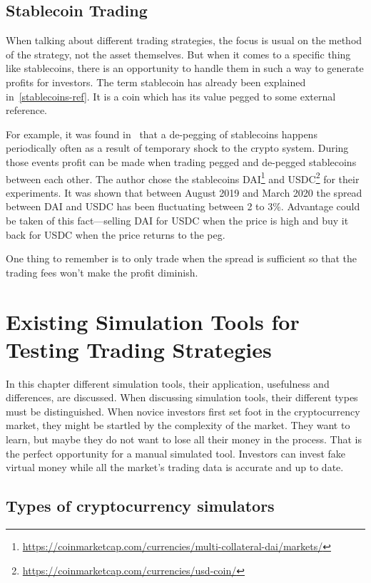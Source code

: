 \section{Stablecoin Trading}

When talking about different trading strategies, the focus is usual on the method of the strategy, not the asset themselves. But when it comes to a specific thing like stablecoins, there is an opportunity to handle them in such a way to generate profits for investors.
The term stablecoin has already been explained in~\ref{stablecoins-ref}. It is a coin which has its value pegged to some external reference.

For example, it was found in~\cite{make-money-stablecoins} that a de-pegging of stablecoins happens periodically often as a result of temporary shock to the crypto system. During those events profit can be made when trading pegged and de-pegged stablecoins between each other. The author chose the stablecoins DAI\footnote{\url{https://coinmarketcap.com/currencies/multi-collateral-dai/markets/}} and USDC\footnote{\url{https://coinmarketcap.com/currencies/usd-coin/}} for their experiments. It was shown that between August 2019 and March 2020 the spread between DAI and USDC has been fluctuating between 2 to 3\%. Advantage could be taken of this fact---selling DAI for USDC when the price is high and buy it back for USDC when the price returns to the peg.

One thing to remember is to only trade when the spread is sufficient so that the trading fees won't make the profit diminish.

\chapter{Existing Simulation Tools for Testing Trading Strategies}
\label{chapter-simulation-tools}

In this chapter different simulation tools, their application, usefulness and differences, are discussed. When discussing simulation tools, their different types must be distinguished. When novice investors first set foot in the cryptocurrency market, they might be startled by the complexity of the market. They want to learn, but maybe they do not want to lose all their money in the process. That is the perfect opportunity for a manual simulated tool. Investors can invest fake virtual money while all the market's trading data is accurate and up to date.

\section*{Types of cryptocurrency simulators}

